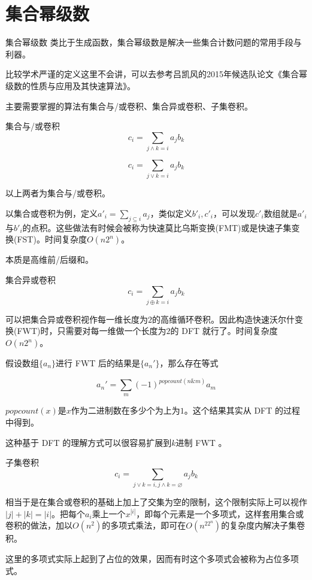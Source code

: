 \documentclass{beamer}
\begin{document}
	\section{集合幂级数}
	\begin{frame}{集合幂级数}
		类比于生成函数，集合幂级数是解决一些集合计数问题的常用手段与利器。
		
		比较学术严谨的定义这里不会讲，可以去参考吕凯风的2015年候选队论文《集合幂级数的性质与应用及其快速算法》。
		
		主要需要掌握的算法有集合与/或卷积、集合异或卷积、子集卷积。
	\end{frame}
	\begin{frame}{集合与/或卷积}
		$$c_i=\sum_{j\land k = i}a_jb_k$$
		
		$$c_i=\sum_{j\lor k = i}a_jb_k$$
		
		以上两者为集合与/或卷积。
		
		以集合或卷积为例，定义$a'_i=\sum_{j \subseteq i}a_j$，类似定义$b'_i,c'_i$，可以发现$c'_i$数组就是$a'_i$与$b'_i$的点积。这些做法有时候会被称为快速莫比乌斯变换(FMT)或是快速子集变换(FST)。时间复杂度$O(n2^n)$。
		
		本质是高维前/后缀和。
	\end{frame}
	\begin{frame}{集合异或卷积}
		$$c_i=\sum_{j \oplus k = i}a_jb_k$$
		
		可以把集合异或卷积视作每一维长度为$2$的高维循环卷积。因此构造快速沃尔什变换(FWT)时，只需要对每一维做一个长度为$2$的 DFT 就行了。时间复杂度$O(n2^n)$。
		
		假设数组$\{a_n\}$进行 FWT 后的结果是$\{a_n'\}$，那么存在等式
		
		$$a_n' = \sum_{m}(-1)^{popcount(n \& m)}a_m$$
		
		$popcount(x)$是$x$作为二进制数在多少个为上为$1$。这个结果其实从 DFT 的过程中得到。
		
		这种基于 DFT 的理解方式可以很容易扩展到$k$进制 FWT 。
	\end{frame}
	\begin{frame}{子集卷积}
		$$c_i=\sum_{j\lor k = i,j \land k = \varnothing}a_jb_k$$
		
		相当于是在集合或卷积的基础上加上了交集为空的限制，这个限制实际上可以视作$|j|+|k|=|i|$。把每个$a_i$乘上一个$x^{|i|}$，即每个元素是一个多项式，这样套用集合或卷积的做法，加以$O(n^2)$的多项式乘法，即可在$O(n^22^n)$的复杂度内解决子集卷积。
		
		这里的多项式实际上起到了占位的效果，因而有时这个多项式会被称为占位多项式。
	\end{frame}
\end{document}
